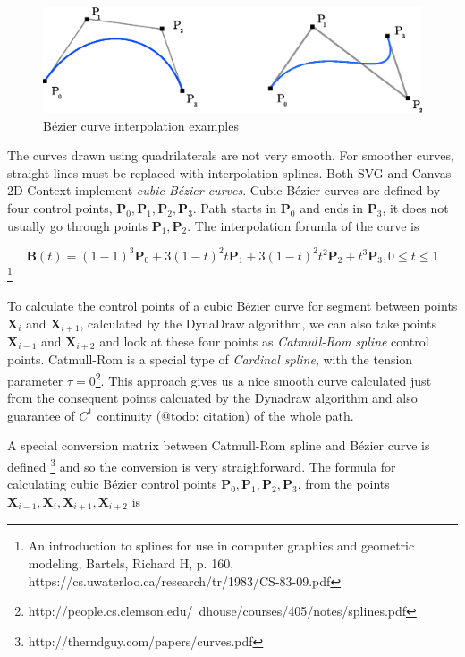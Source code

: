 \begin{figure}
	\centering
  		\includegraphics[width=130mm]{../img/bezier_curves.eps}
  		\caption{Bézier curve interpolation examples}
  		\label{fig:bezier-curve}
\end{figure}

The curves drawn using quadrilaterals are not very smooth. For smoother curves, straight lines must be replaced with interpolation splines. Both SVG and Canvas 2D Context implement \textit{cubic Bézier curves}. Cubic Bézier curves are defined by four control points, $ \mathbf{P}_0, \mathbf{P}_1, \mathbf{P}_2, \mathbf{P}_3 $. Path starts in $ \mathbf{P}_0 $ and ends in $ \mathbf{P}_3 $, it does not usually go through points $ \mathbf{P}_1, \mathbf{P}_2 $. The interpolation forumla of the curve is

$$ \mathbf{B}(t) = (1 - 1)^3 \mathbf{P}_0 + 3(1-t)^{2}t\mathbf{P}_1 + 3(1-t)^{2}t^2\mathbf{P}_2 + t^3\mathbf{P}_3, 0 \leq t \leq 1$$ \cite{}\footnote{An introduction to splines for use in computer graphics and geometric modeling, Bartels, Richard H, p. 160, https://cs.uwaterloo.ca/research/tr/1983/CS-83-09.pdf}

To calculate the control points of a cubic Bézier curve for segment between points $\mathbf{X}_i$ and $\mathbf{X}_{i+1}$, calculated by the DynaDraw algorithm, we can also take points $\mathbf{X}_{i-1}$ and $\mathbf{X}_{i+2}$ and look at these four points as \textit{Catmull-Rom spline} control points. Catmull-Rom is a special type of \textit{Cardinal spline}, with the tension parameter $\tau = 0$\cite{}\footnote{http://people.cs.clemson.edu/~dhouse/courses/405/notes/splines.pdf}. This approach gives us a nice smooth curve calculated just from the consequent points calcuated by the Dynadraw algorithm and also guarantee of $C^1$ continuity (@todo: citation) of the whole path.

A special conversion matrix between Catmull-Rom spline and Bézier curve is defined \cite{}\footnote{http://therndguy.com/papers/curves.pdf} and so the conversion is very straighforward. The formula for calculating cubic Bézier control points $ \mathbf{P}_0, \mathbf{P}_1, \mathbf{P}_2, \mathbf{P}_3 $, from the points $ \mathbf{X}_{i-1}, \mathbf{X}_i, \mathbf{X}_{i+1}, \mathbf{X}_{i+2} $ is

